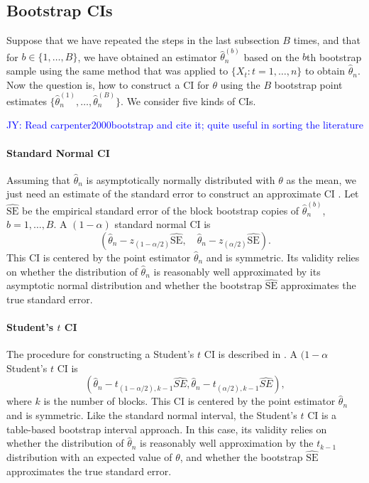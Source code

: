 \documentclass[12pt, letterpaper, titlepage]{article}
\newcommand{\jy}[1]{\textcolor{blue}{JY: #1}}
\begin{document}
\subsection{Bootstrap CIs}

Suppose that we have repeated the steps in the last subsection $B$ times, and
that for $b \in \{1, \ldots, B\}$, we have obtained an estimator
$\hat\theta_n^{(b)}$ based on the $b$th bootstrap sample using the same method
that was applied to $\{X_t: t = 1, \ldots, n\}$ to obtain $\hat\theta_n$.
Now the question is, how to construct a CI for $\theta$
using the $B$ bootstrap point estimates
$\{\hat\theta_n^{(1)}, \ldots, \hat\theta_n^{(B)}\}$.
We consider five kinds of CIs.

\jy{Read carpenter2000bootstrap and cite it; quite useful in sorting the literature}

\paragraph{Standard Normal CI}
Assuming that $\hat\theta_n$ is asymptotically normally distributed with
$\theta$ as the mean, we just need an estimate of the standard error to
construct an approximate CI \citep[p.168]{efron1993introduction}.
Let $\widehat{\text{SE}}$ be the empirical standard error of the block bootstrap
copies of $\hat\theta_n^{(b)}$, $b = 1, \ldots, B$.
A $(1 - \alpha)$ standard normal CI is
\[
(\hat{\theta}_{n} - z_{(1-\alpha/2)}\widehat{\text{SE}}, \quad
\hat{\theta}_{n} - z_{(\alpha/2)}\widehat{\text{SE}}).
\]
This CI is centered by the point estimator $\hat\theta_n$ and is symmetric.
Its validity relies on whether the distribution of $\hat\theta_n$ is reasonably
well approximated by its asymptotic normal distribution and whether the
bootstrap $\widehat{\text{SE}}$ approximates the true standard error.



\paragraph{Student's $t$ CI}
The procedure for constructing a Student's $t$ CI is described in 
\citet{efron1993introduction}.
A $(1 - \alpha$ Student's $t$ CI is
\[
(\hat{\theta}_{n} - t_{(1-\alpha/2), k - 1}\hat{SE}, \hat{\theta}_{n} -
t_{(\alpha/2), k -1}\hat{SE}),
\]
where $k$ is the number of blocks.
This CI is centered by the point estimator $\hat\theta_n$ and is symmetric.
Like the standard 
normal interval, the Student's $t$ CI is a table-based bootstrap interval
approach. In this case,
its validity relies on whether the distribution of $\hat\theta_n$ is
reasonably well approximation by the $t_{k-1}$ distribution with an
expected value of $\theta$, and whether the bootstrap 
$\widehat{\text{SE}}$ approximates the true standard error.
\end{document}
